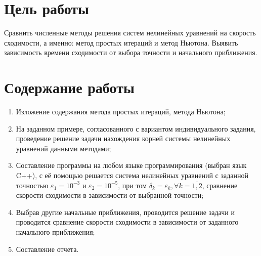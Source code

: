 \section{Цель работы}

Сравнить численные методы решения систем нелинейных уравнений на скорость сходимости, а именно: метод простых итераций и метод Ньютона. Выявить зависимость времени сходимости от выбора точности и начального приближения.

\section{Содержание работы}
\begin{enumerate}
	\item Изложение содержания метода простых итераций, метода Ньютона;
	\item На заданном примере, согласованного с вариантом индивидуального задания, проведение решение задачи нахождения корней системы нелинейных уравнений данными методами;
	\item Составление программы на любом языке программирования (выбран язык C++), с её помощью решается система нелинейных уравнений с заданной точностью \( \varepsilon_1 = 10^{-3} \) и \(\varepsilon_2 = 10^{-5}\), при том \(\delta_k = \varepsilon_k, \forall k = \overline{1, 2}\), сравнение скорости сходимости в зависимости от выбранной точности;
	\item Выбрав другие начальные приближения, проводится решение задачи и проводится сравнение скорости сходимости в зависимости от заданного начального приближения;
	\item Составление отчета.
\end{enumerate}

